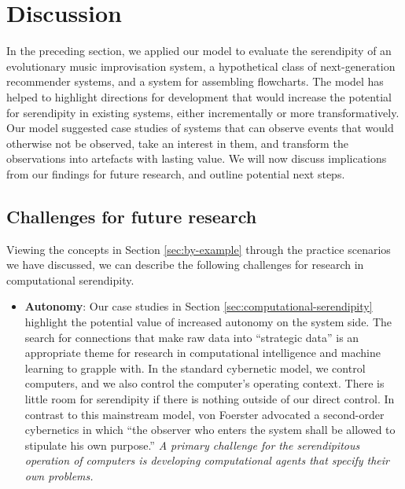 
\section{Discussion} \label{sec:discussion}

In the preceding section, we applied our model to evaluate the serendipity of an evolutionary music improvisation system, a hypothetical class of next-generation recommender systems, and a system for assembling flowcharts.  The model has helped to highlight directions for development that would increase the potential for serendipity in existing systems, either incrementally or more transformatively.  Our model suggested case studies of systems that can observe events that would otherwise not be observed, take an interest in them, and transform the observations into artefacts with lasting value.  We will now discuss implications from our findings for future research, and outline potential next steps.

%
%
%

\subsection{Challenges for future research} \label{sec:recommendations}

Viewing the concepts in Section \ref{sec:by-example} through the
practice scenarios we have discussed, we can describe the following
challenges for research in computational serendipity.

\begin{itemize}
\item \textbf{Autonomy}: Our case studies in Section
  \ref{sec:computational-serendipity} highlight the potential value of
  increased autonomy on the system side.
The search for connections that make raw data into ``strategic data''
is an appropriate theme for research in computational intelligence and
machine learning to grapple with.  In the standard cybernetic model,
we control computers, and we also control the computer's operating
context.  There is little room for serendipity if there is nothing
outside of our direct control.  In contrast to this mainstream model,
von Foerster \citeyear[p. 286]{von2003cybernetics} advocated a
second-order cybernetics in which ``the observer who enters the system
shall be allowed to stipulate his own purpose.''  \emph{A
  primary challenge for the serendipitous operation of computers is
  developing computational agents that specify their own problems.}
\end{itemize}

